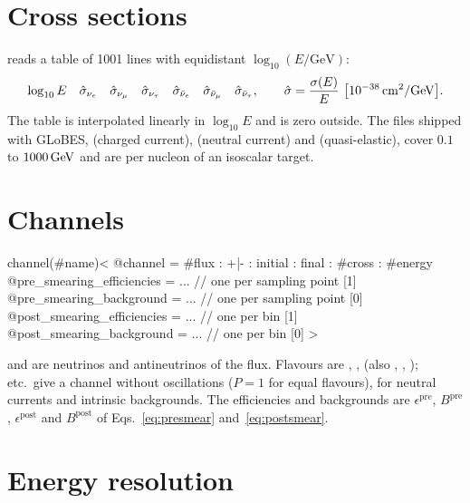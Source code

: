 \section{Cross sections}\label{sec:aedl-cross}

 reads a table of 1001 lines with
equidistant $\log_{10}(E/\mathrm{GeV})$:
\[
\log_{10}E\quad \hat\sigma_{\nue}\quad\hat\sigma_{\numu}\quad\hat\sigma_{\nu_\tau}\quad
\hat\sigma_{\bar\nu_e}\quad\hat\sigma_{\bar\nu_\mu}\quad\hat\sigma_{\bar\nu_\tau},
\qquad \hat\sigma = \frac{\sigma(E)}{E}\ \bigl[10^{-38}\,\mathrm{cm^2/GeV}\bigr].
\]
The table is interpolated linearly in $\log_{10}E$ and is zero outside. The
files shipped with GLoBES,  (charged current), 
(neutral current) and  (quasi-elastic), cover $0.1$ to $1000\,\mathrm{GeV}$
and are per nucleon of an isoscalar target.

\section{Channels}\label{sec:aedl-channel}

\begin{aedl}
channel(#name)<
   @channel = #flux : +|- : initial : final : #cross : #energy
   @pre_smearing_efficiencies  = {...}    // one per sampling point [1]
   @pre_smearing_background    = {...}    // one per sampling point [0]
   @post_smearing_efficiencies = {...}    // one per bin [1]
   @post_smearing_background   = {...}    // one per bin [0]
>
\end{aedl}
\code{+} and \code{-} are neutrinos and antineutrinos of the flux. Flavours are
, ,  (also , , );
 etc.\ give a channel without oscillations ($P=1$ for equal
flavours), for neutral currents and intrinsic backgrounds. The efficiencies and
backgrounds are $\epsilon^\text{pre}$, $B^\text{pre}$, $\epsilon^\text{post}$
and $B^\text{post}$ of Eqs.~\eqref{eq:presmear} and~\eqref{eq:postsmear}.

\section{Energy resolution}\label{sec:aedl-energy}

